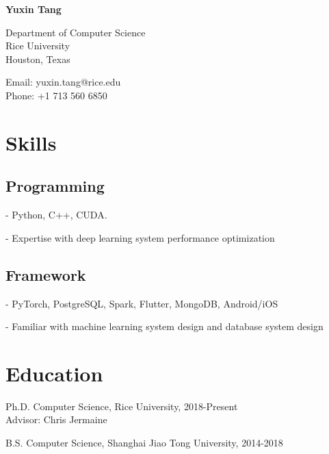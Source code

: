 \documentclass[12pt,letterpaper]{report}
\newcommand{\myname}{Yuxin Tang}
\newcommand{\namefont}[1]{{\normalfont\bfseries\Huge{#1}}}
\newcommand{\listitemspace}{0.05em}
\renewenvironment{itemize}
{\begin{list}{}{\setlength{\leftmargin}{0em}
			\setlength{\parskip}{0em}
			\setlength{\itemsep}{\listitemspace}
			\setlength{\parsep}{\listitemspace}}}
	{\end{list}}
\begin{document}
	\raggedright
	
	\namefont{\myname}
	
	\vspace{1em}
	\begin{minipage}[t]{0.495\textwidth}
		Department of Computer Science \\
		Rice University \\
		Houston, Texas
	\end{minipage}
	\begin{minipage}[t]{0.495\textwidth}
		Email: yuxin.tang@rice.edu \\
		Phone: +1 713 560 6850
	\end{minipage}
	\vspace{0.5em}

	\section*{Skills}
	
	\subsection*{Programming}
	
	\begin{itemize}
		\item - Python, C++, CUDA. 
		\item - Expertise with deep learning system performance optimization
	\end{itemize}
	
	\subsection*{Framework}
	
	\begin{itemize}
		\item - PyTorch, PostgreSQL, Spark, Flutter, MongoDB, Android/iOS
		\item - Familiar with machine learning system design and database system design
	\end{itemize}	
	
	\section*{Education}
	
	\begin{tablist}
		\item[Ph.D.] \tab Computer Science, Rice University, 2018-Present \\
		Advisor: Chris Jermaine\\
		\item[B.S.]  \tab Computer Science, Shanghai Jiao Tong University, 2014-2018
	\end{tablist}
\end{document}
